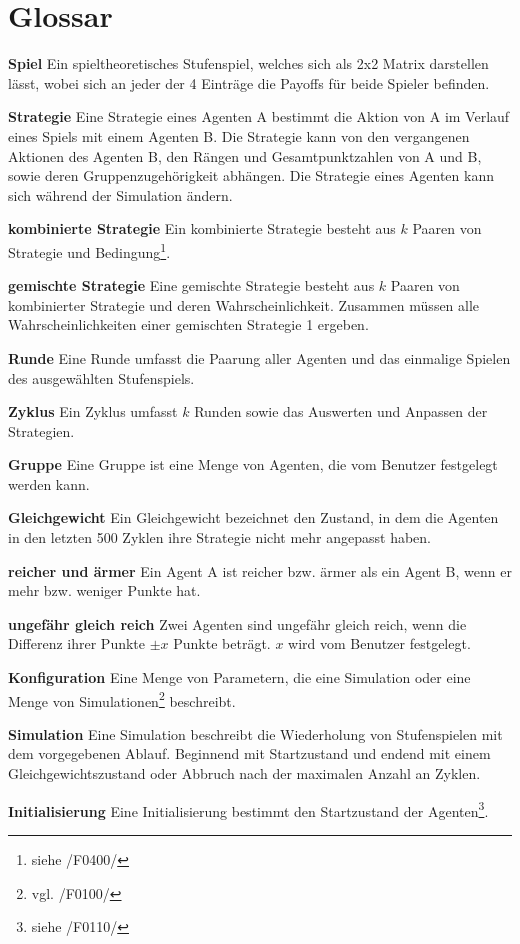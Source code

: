 \section{Glossar}

\textbf{Spiel}
Ein spieltheoretisches Stufenspiel, welches sich als 2x2 Matrix darstellen lässt, wobei sich an jeder der 4 Einträge die Payoffs für beide Spieler befinden.

\textbf{Strategie}
Eine Strategie eines Agenten A bestimmt die Aktion von A im Verlauf eines Spiels mit einem Agenten B. Die Strategie kann von den vergangenen Aktionen des Agenten B, den Rängen und Gesamtpunktzahlen von A und B, sowie deren Gruppenzugehörigkeit abhängen. Die Strategie eines Agenten kann sich während der Simulation ändern.

\textbf{kombinierte Strategie}
Ein kombinierte Strategie besteht aus $k$ Paaren von Strategie und Bedingung\footnote{siehe /F0400/}. 

\textbf{gemischte Strategie}
Eine gemischte Strategie besteht aus $k$ Paaren von kombinierter Strategie und deren Wahrscheinlichkeit. Zusammen müssen alle Wahrscheinlichkeiten einer gemischten Strategie 1 ergeben.

\textbf{Runde}
Eine Runde umfasst die Paarung aller Agenten und das einmalige Spielen des ausgewählten Stufenspiels.

\textbf{Zyklus}
Ein Zyklus umfasst $k$ Runden sowie das Auswerten und Anpassen der Strategien.

\textbf{Gruppe}
Eine Gruppe ist eine Menge von Agenten, die vom Benutzer festgelegt werden kann.

\textbf{Gleichgewicht}
Ein Gleichgewicht bezeichnet den Zustand, in dem die Agenten in den letzten 500 Zyklen ihre Strategie nicht mehr angepasst haben.

\textbf{reicher und ärmer}
Ein Agent A ist reicher bzw. ärmer als ein Agent B, wenn er mehr bzw. weniger Punkte hat.

\textbf{ungefähr gleich reich}
Zwei Agenten sind ungefähr gleich reich, wenn die Differenz ihrer Punkte $\pm x$ Punkte beträgt. $x$ wird vom Benutzer festgelegt. 

\textbf{Konfiguration}
Eine Menge von Parametern, die eine Simulation oder eine Menge von Simulationen\footnote{vgl. /F0100/} beschreibt.

\textbf{Simulation}
Eine Simulation beschreibt die Wiederholung von Stufenspielen mit dem vorgegebenen Ablauf. Beginnend mit Startzustand und endend mit einem Gleichgewichtszustand oder Abbruch nach der maximalen Anzahl an Zyklen.

\textbf{Initialisierung}
Eine Initialisierung bestimmt den Startzustand der Agenten\footnote{siehe /F0110/}.